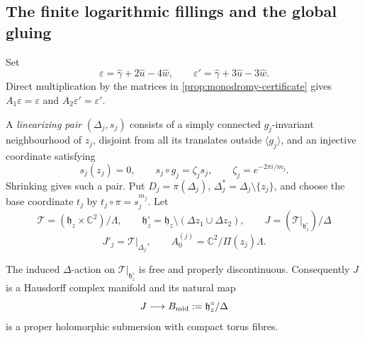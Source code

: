 \subsection{The finite logarithmic fillings and the global gluing}

Set
\[
 \varepsilon=\widehat\gamma+2\widehat u-4\widehat w,
 \qquad
 \varepsilon'=\widehat\gamma+3\widehat u-3\widehat w.
 \tag{2.8a}
\]
Direct multiplication by the matrices in
\cref{prop:monodromy-certificate} gives
\(A_1\varepsilon=\varepsilon\) and
\(A_2\varepsilon'=\varepsilon'\).

A \emph{linearizing pair} \((\Delta_j,s_j)\) consists of a simply connected
\(g_j\)-invariant neighbourhood of \(z_j\), disjoint from all its translates
outside \(\langle g_j\rangle\), and an injective coordinate satisfying
\[
 s_j(z_j)=0,\qquad s_j\circ g_j=\zeta_js_j,
 \qquad \zeta_j=e^{-2\pi i/m_j}.
 \tag{2.8b}
\]
Shrinking gives such a pair.  Put \(D_j=\pi(\Delta_j)\),
\(\Delta_j^*=\Delta_j\setminus\{z_j\}\), and choose the base coordinate
\(t_j\) by \(t_j\circ\pi=s_j^{m_j}\).  Let
\[
 \mathcal T=(\mathfrak h_z\times\mathbb C^2)/\Lambda,
 \qquad
 \mathfrak h_z^\circ=\mathfrak h_z\setminus
 (\Delta z_1\cup\Delta z_2),
 \qquad
 J=(\mathcal T|_{\mathfrak h_z^\circ})/\Delta
 \]
\[
 J'_j=\mathcal T|_{\Delta_j},
 \qquad
 A_0^{(j)}=\mathbb C^2/\Pi(z_j)\Lambda.
 \tag{2.8c}
\]

\begin{lemma}
\label{lem:middle-period-proper}
The induced \(\Delta\)-action on
\(\mathcal T|_{\mathfrak h_z^\circ}\) is free and properly discontinuous.
Consequently \(J\) is a Hausdorff complex manifold and its natural map
\[
 J\longrightarrow B_{\rm mid}:=\mathfrak h_z^\circ/\Delta
\]
is a proper holomorphic submersion with compact torus fibres.
\end{lemma}

